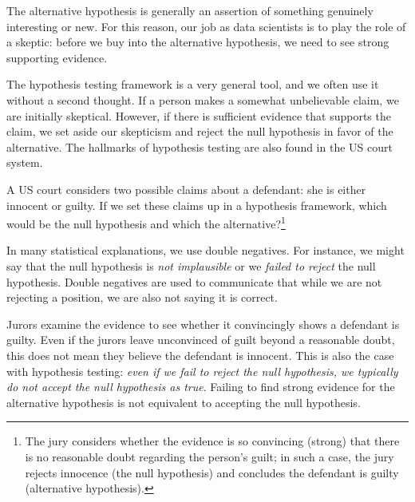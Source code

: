 \begin{tipBox}{
  The alternative hypothesis is generally an assertion of
  something genuinely interesting or new. For this reason,
  our job as data scientists is to play the role of a skeptic:
  before we buy into the alternative hypothesis, we need to
  see strong supporting evidence.}
\end{tipBox}

The hypothesis testing framework is a very general tool, and we often use it without a second thought. If a person makes a somewhat unbelievable claim, we are initially skeptical. However, if there is sufficient evidence that supports the claim, we set aside our skepticism and reject the null hypothesis in favor of the alternative. The hallmarks of hypothesis testing are also found in the US court system. 

\begin{exercise} \label{hypTestCourtExample}
A US court considers two possible claims about a defendant: she is either innocent or guilty. If we set these claims up in a hypothesis framework, which would be the null hypothesis and which the alternative?\footnote{The jury considers whether the evidence is so convincing (strong) that there is no reasonable doubt regarding the person's guilt; in such a case, the jury rejects innocence (the null hypothesis) and concludes the defendant is guilty (alternative hypothesis).}
\end{exercise}

\begin{tipBox}{
In many statistical explanations, we use double negatives. For instance, we might say that the null hypothesis is \emph{not implausible} or we \emph{failed to reject} the null hypothesis. Double negatives are used to communicate that while we are not rejecting a position, we are also not saying it is correct.}
\end{tipBox}

Jurors examine the evidence to see whether it convincingly shows a defendant is guilty. Even if the jurors leave unconvinced of guilt beyond a reasonable doubt, this does not mean they believe the defendant is innocent. This is also the case with hypothesis testing: \emph{even if we fail to reject the null hypothesis, we typically do not accept the null hypothesis as true}. Failing to find strong evidence for the alternative hypothesis is not equivalent to accepting the null hypothesis.

